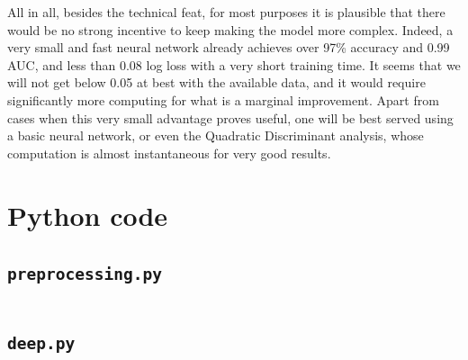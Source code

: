 \documentclass[a4paper,11pt,openany,extrafontsizes,oneside,article,twocolumn]{memoir}
\begin{document}
All in all, besides the technical feat, for most purposes it is
plausible that there would be no strong incentive to keep making the
model more complex. Indeed, a very small and fast neural network
already achieves over 97\% accuracy and 0.99 AUC, and less than 0.08
log loss with a very short training time. It seems that we will not
get below 0.05 at best with the available data, and it would require
significantly more computing for what is a marginal improvement. Apart
from cases when this very small advantage proves useful, one will be
best served using a basic neural network, or even the Quadratic
Discriminant analysis, whose computation is almost instantaneous for
very good results.



\backmatter%
\onecolumn%

\chapter{Python code}

\section{\texttt{preprocessing.py}}

\inputminted[linenos,stepnumber=5]{python}{../preprocessing.py}

\section{\texttt{deep.py}}

\inputminted[linenos,stepnumber=5]{python}{../deep.py}



% 
\end{document}

